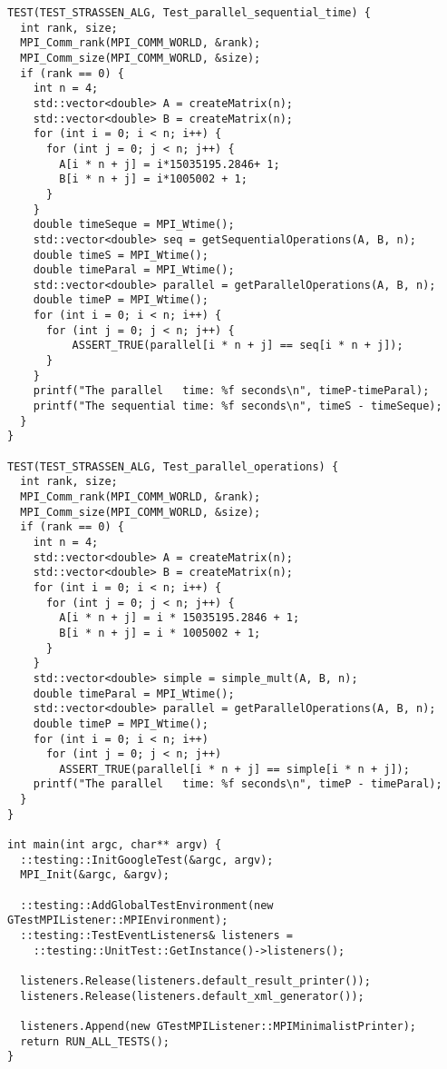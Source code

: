 \documentclass{report}
\begin{document}
\begin{lstlisting}
TEST(TEST_STRASSEN_ALG, Test_parallel_sequential_time) {
  int rank, size;
  MPI_Comm_rank(MPI_COMM_WORLD, &rank);
  MPI_Comm_size(MPI_COMM_WORLD, &size);
  if (rank == 0) {
    int n = 4;
    std::vector<double> A = createMatrix(n);
    std::vector<double> B = createMatrix(n);
    for (int i = 0; i < n; i++) {
      for (int j = 0; j < n; j++) {
        A[i * n + j] = i*15035195.2846+ 1;
        B[i * n + j] = i*1005002 + 1;
      }
    }
    double timeSeque = MPI_Wtime();
    std::vector<double> seq = getSequentialOperations(A, B, n);
    double timeS = MPI_Wtime();
    double timeParal = MPI_Wtime();
    std::vector<double> parallel = getParallelOperations(A, B, n);
    double timeP = MPI_Wtime();
    for (int i = 0; i < n; i++) {
      for (int j = 0; j < n; j++) {
          ASSERT_TRUE(parallel[i * n + j] == seq[i * n + j]);
      }
    }
    printf("The parallel   time: %f seconds\n", timeP-timeParal);
    printf("The sequential time: %f seconds\n", timeS - timeSeque);
  }
}

TEST(TEST_STRASSEN_ALG, Test_parallel_operations) {
  int rank, size;
  MPI_Comm_rank(MPI_COMM_WORLD, &rank);
  MPI_Comm_size(MPI_COMM_WORLD, &size);
  if (rank == 0) {
    int n = 4;
    std::vector<double> A = createMatrix(n);
    std::vector<double> B = createMatrix(n);
    for (int i = 0; i < n; i++) {
      for (int j = 0; j < n; j++) {
        A[i * n + j] = i * 15035195.2846 + 1;
        B[i * n + j] = i * 1005002 + 1;
      }
    }
    std::vector<double> simple = simple_mult(A, B, n);
    double timeParal = MPI_Wtime();
    std::vector<double> parallel = getParallelOperations(A, B, n);
    double timeP = MPI_Wtime();
    for (int i = 0; i < n; i++)
      for (int j = 0; j < n; j++)
        ASSERT_TRUE(parallel[i * n + j] == simple[i * n + j]);
    printf("The parallel   time: %f seconds\n", timeP - timeParal);
  }
}

int main(int argc, char** argv) {
  ::testing::InitGoogleTest(&argc, argv);
  MPI_Init(&argc, &argv);

  ::testing::AddGlobalTestEnvironment(new GTestMPIListener::MPIEnvironment);
  ::testing::TestEventListeners& listeners =
    ::testing::UnitTest::GetInstance()->listeners();

  listeners.Release(listeners.default_result_printer());
  listeners.Release(listeners.default_xml_generator());

  listeners.Append(new GTestMPIListener::MPIMinimalistPrinter);
  return RUN_ALL_TESTS();
}
\end{lstlisting}
\end{document}
